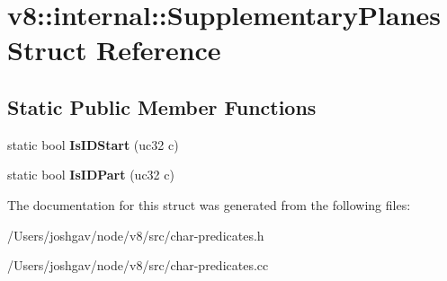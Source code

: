 \hypertarget{structv8_1_1internal_1_1_supplementary_planes}{}\section{v8\+:\+:internal\+:\+:Supplementary\+Planes Struct Reference}
\label{structv8_1_1internal_1_1_supplementary_planes}
\subsection*{Static Public Member Functions}
\begin{DoxyCompactItemize}
\item 
static bool {\bfseries Is\+I\+D\+Start} (uc32 c)\hypertarget{structv8_1_1internal_1_1_supplementary_planes_a733c39e5239f5601a06ff0db466e491b}{}\label{structv8_1_1internal_1_1_supplementary_planes_a733c39e5239f5601a06ff0db466e491b}

\item 
static bool {\bfseries Is\+I\+D\+Part} (uc32 c)\hypertarget{structv8_1_1internal_1_1_supplementary_planes_a21c46fba4bcb54d2f880aaf06489be45}{}\label{structv8_1_1internal_1_1_supplementary_planes_a21c46fba4bcb54d2f880aaf06489be45}

\end{DoxyCompactItemize}


The documentation for this struct was generated from the following files\+:\begin{DoxyCompactItemize}
\item 
/\+Users/joshgav/node/v8/src/char-\/predicates.\+h\item 
/\+Users/joshgav/node/v8/src/char-\/predicates.\+cc\end{DoxyCompactItemize}
